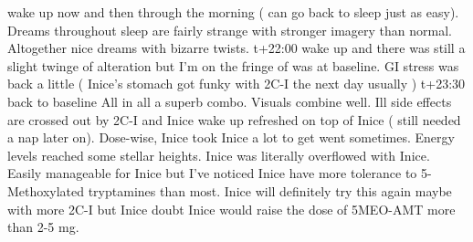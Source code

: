 \documentclass[12pt]{book}
\begin{document}
wake up now and then through the morning ( can go back to sleep just as easy). Dreams throughout sleep are fairly strange with stronger imagery than normal. Altogether nice dreams with bizarre twists. t+22:00 wake up and there was still a slight twinge of alteration but I'm on the fringe of was at baseline. GI stress was back a little ( Inice's stomach got funky with 2C-I the next day usually ) t+23:30 back to baseline All in all a superb combo. Visuals combine well. Ill side effects are crossed out by 2C-I and Inice wake up refreshed on top of Inice ( still needed a nap later on). Dose-wise, Inice took Inice a lot to get went sometimes. Energy levels reached some stellar heights. Inice was literally overflowed with Inice. Easily manageable for Inice but I've noticed Inice have more tolerance to 5-Methoxylated tryptamines than most. Inice will definitely try this again maybe with more 2C-I but Inice doubt Inice would raise the dose of 5MEO-AMT more than 2-5 mg.
\end{document}
